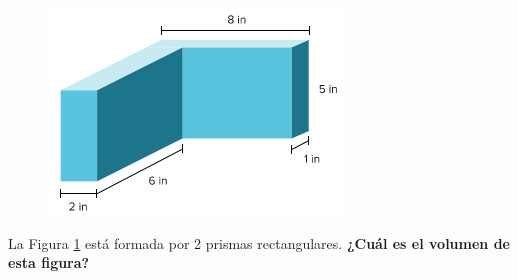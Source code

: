 \begin{multicols}{2}
    \begin{figure}[H]
        \centering
        \includegraphics[width=0.5\linewidth]{../images/20230316213725}
        \caption{}
        \label{fig:20230316213725}
    \end{figure}
    \columnbreak
    La Figura \ref{fig:20230316213725} está formada por 2 prismas rectangulares.
    \textbf{¿Cuál es el volumen de esta figura?}
\end{multicols}
